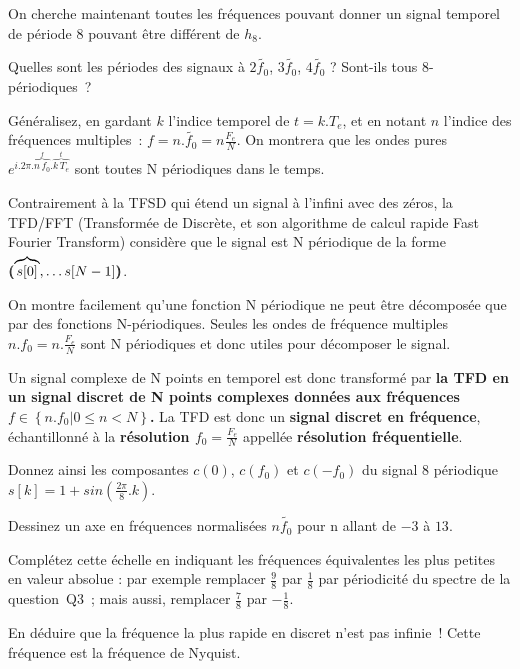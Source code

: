 On cherche maintenant toutes les fréquences pouvant donner un signal
temporel de période 8 pouvant être différent de $h_8$. 

Quelles sont les périodes des signaux à $2\widetilde{f_0}$,
$3\widetilde{f_0}$, $4\widetilde{f_0}$ ? Sont-ils tous 8-périodiques~?

Généralisez, en gardant $k$ l'indice temporel de $t=k.T_e$, et en notant
$n$ l'indice des fréquences multiples~:
$f=n.\widetilde{f_0}=n\frac{F_e}{N}$. On montrera que les ondes pures
$e^{i.2\pi.\overbrace{n\,f_0}^{f}.\overbrace{k\,T_e}^{t}}$ sont toutes
N périodiques dans le temps.

\begin{remarque}

  Contrairement à la TFSD qui étend un signal à l'infini avec des zéros, la TFD/FFT (Transformée de \Fourier{} Discrète, et son algorithme de calcul rapide Fast Fourier Transform) considère que le signal est N périodique de la forme $(\!\!( \overbrace{s[0]}^{}, \dots s[N-1] )\!\!)$.
  
  On montre facilement qu'une fonction N périodique ne peut être
  décomposée que par des fonctions N-périodiques. Seules les ondes de
  fréquence multiples $n.f_0= n.\frac{F_e}{N}$ sont N périodiques et
  donc utiles pour décomposer le signal.

  Un signal complexe de N points en temporel est donc transformé par
  \textbf{la TFD en un signal discret de N points complexes données
    aux fréquences $f \in \left\{n.f_0 | 0 \le n<N\right\}$.}  La TFD
  est donc un \textbf{signal discret en fréquence}, échantillonné à la
  \textbf{résolution $f_0=\frac{F_e}{N}$} appellée \textbf{résolution
    fréquentielle}.
\end{remarque}





Donnez ainsi les composantes $c(0)$, $c(f_0)$ et $c(-f_0)$ du signal 8
périodique $s[k]= 1 + sin(\frac{2\pi}{8}.k)$.


Dessinez un axe en fréquences normalisées $n\widetilde{f_0}$ pour n allant de $-3$ à $13$.

Complétez cette échelle en indiquant les fréquences équivalentes les
plus petites en valeur absolue : par exemple remplacer $\frac{9}{8}$
par $\frac{1}{8}$ par périodicité du spectre de la question~Q3~; mais
aussi, remplacer $\frac{7}{8}$ par $-\frac{1}{8}$.


En déduire que la fréquence la plus rapide en discret n'est pas
infinie~! Cette fréquence est la fréquence de Nyquist.





